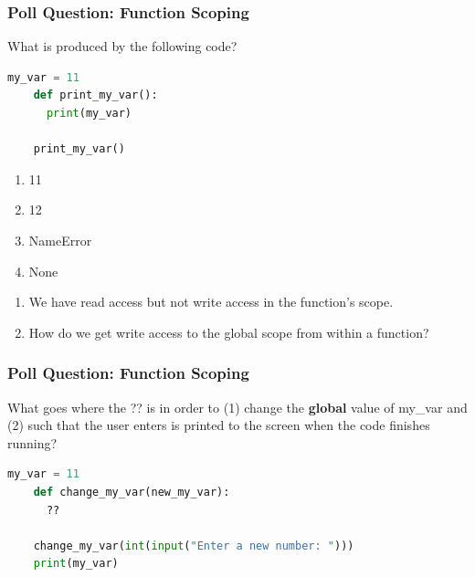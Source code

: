 \documentclass{beamer}
\begin{document}
%
%
%
\begin{frame}[fragile]
  \frametitle{Poll Question: Function Scoping}
  \begin{minipage}{0.69\textwidth}
    What is produced by the following code?
    \begin{lstlisting}[language=Python, autogobble]
    my_var = 11
    def print_my_var():
      print(my_var)

    print_my_var()
    \end{lstlisting}
  \end{minipage}
  \hfill
  \begin{minipage}{0.29\textwidth}
    \begin{enumerate}[A]
      \item 11
      \item 12
      \item NameError
      \item None
    \end{enumerate}
  \end{minipage}
  \pause
  \vfill
  \begin{enumerate}
    \item We have read access but not write access in the function's scope. 
    \item How do we get write access to the global scope from within a function?
  \end{enumerate}
\end{frame}

%
%
%
\begin{frame}[fragile]
  \frametitle{Poll Question: Function Scoping}
  What goes where the ?? is in order to (1) change the \textbf{global} value of my\_var and (2) such that the user enters is printed to the screen when the code finishes running?
  \vfill
  \begin{lstlisting}[language=Python, autogobble]
    my_var = 11
    def change_my_var(new_my_var):
      ??

    change_my_var(int(input("Enter a new number: ")))
    print(my_var)
  \end{lstlisting}
\end{frame}
\end{document}
